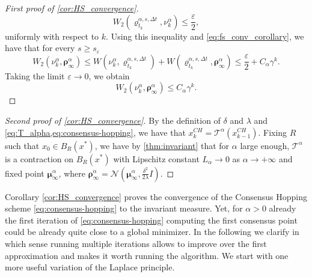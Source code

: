 \documentclass[reqno]{amsart}
\numberwithin{algorithm}{section}
\newcommand{\mc}[1]{\mathcal{#1}}
\begin{document}
{\begin{proof}[First proof of \cref{cor:HS_convergence}]
    $$W_2(\varrho_{t_k}^{\alpha,s,\Delta t},\nu_k^\alpha)\leq \frac{\varepsilon}{2},$$
    {uniformly with respect to $k$.}
    Using this inequality and \cref{eq:fs_conv_corollary}, we have that for every $s\geq s_\varepsilon$ 
    $$W_2(\nu_k^\alpha,\boldsymbol\rho_\infty^\alpha)\leq W(\nu_k^\alpha,\varrho_{t_k}^{\alpha,s,\Delta t}) + W(\varrho_{t_k}^{\alpha,s,\Delta t},\boldsymbol\rho_\infty^\alpha)\leq \frac{\varepsilon}{2} + C_\alpha \gamma^k.$$
    Taking the limit $\varepsilon \to 0$, we obtain
    $$W_2(\nu_k^\alpha,\boldsymbol\rho_\infty^\alpha)\leq C_\alpha \gamma^k.$$
\end{proof}
\begin{proof}[Second proof of \cref{cor:HS_convergence}]
    By the definition of $\delta$ and $\lambda$ and \cref{eq:T_alpha,eq:consensus-hopping}, we have that $x_k^{CH} = \mc{T}^\alpha(x_{k-1}^{CH})$. Fixing $R$ such that $x_0 \in B_R(x^*)$, we have by \cref{thm:invariant} that for $\alpha$ large enough, $\mc{T}^\alpha$ is a contraction on $B_{R}(x^*)$ with Lipschitz constant $L_\alpha \to 0$ as $\alpha\to+\infty$ and fixed point $\boldsymbol\mu_\infty^\alpha$, where $\boldsymbol\rho_\infty^\alpha = \mathcal N(\boldsymbol\mu_\infty^\alpha,\frac{\delta^2}{2\lambda}I)$.
\end{proof}

Corollary \ref{cor:HS_convergence} proves the convergence of the Consensus Hopping scheme \eqref{eq:consensus-hopping} to the invariant measure. Yet, for $\alpha>0$ already the first iteration  of \eqref{eq:consensus-hopping} computing the first consensus point could be already quite close to a global minimizer. In the following we clarify in which sense running multiple iterations allows to improve over the first approximation and makes it worth running the algorithm. We start with one more useful variation of the Laplace principle. 

}
\end{document}
